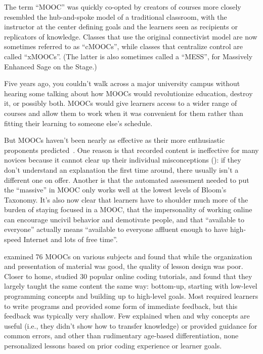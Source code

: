 The term ``MOOC'' was quickly co-opted by creators of
courses more closely resembled the hub-and-spoke model of a traditional classroom,
with the instructor at the center defining goals
and the learners seen as recipients or replicators of knowledge.
Classes that use the original connectivist model are now sometimes referred to as ``cMOOCs'',
while classes that centralize control are called ``xMOOCs''.
(The latter is also sometimes called a ``MESS'',
for Massively Enhanced Sage on the Stage.)

Five years ago,
you couldn't walk across a major university campus
without hearing some talking about how MOOCs would revolutionize education,
destroy it,
or possibly both.
MOOCs would give learners access to a wider range of courses
and allow them to work when it was convenient for them
rather than fitting their learning to someone else's schedule.

But MOOCs haven't been nearly as effective
as their more enthusiastic proponents predicted~\cite{Ubel2017}.
One reason is that
recorded content is ineffective for many novices
because it cannot clear up their individual misconceptions ():
if they don't understand an explanation the first time around,
there usually isn't a different one on offer.
Another is that the automated assessment needed to put the ``massive'' in MOOC
only works well at the lowest levels of Bloom's Taxonomy.
It's also now clear that
learners have to shoulder much more of the burden of staying focused in a MOOC,
that the impersonality of working online can encourage uncivil behavior and demotivate people,
and that ``available to everyone'' actually means
``available to everyone affluent enough to have high-speed Internet and lots of free time''.

\cite{Marg2015} examined 76 MOOCs on various subjects and found that
while the organization and presentation of material was good,
the quality of lesson design was poor.
Closer to home,
\cite{Kim2017} studied 30 popular online coding tutorials,
and found that they largely taught the same content the same way:
bottom-up,
starting with low-level programming concepts and building up to high-level goals.
Most required learners to write programs and provided some form of immediate feedback,
but this feedback was typically very shallow.
Few explained when and why concepts are useful
(i.e., they didn't show how to transfer knowledge)
or provided guidance for common errors,
and other than rudimentary age-based differentiation,
none personalized lessons based on prior coding experience or learner goals.

